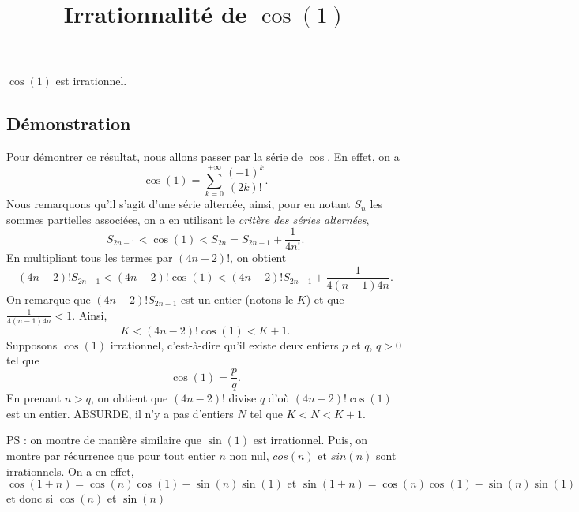 \documentclass[fontsize=12pt,twoside=false,parskip=half,french]{scrartcl}
\title{Irrationnalité de $\cos(1)$}
\date{}
\author{}
\begin{document}
\maketitle
   \begin{Theoreme}
      $\cos(1)$ est irrationnel.
   \end{Theoreme}
   \subsection{Démonstration}
      Pour démontrer ce résultat, nous allons passer par la série de $\cos$.
      En effet, on a 
      \[
        \cos(1) = \sum_{k = 0}^{+\infty} \frac{(-1)^k}{(2k)!}.
      \]
      Nous remarquons qu'il s'agit d'une série alternée, ainsi, pour en notant
      $S_n$ les sommes partielles associées, on a en utilisant le \emph{critère des séries alternées},
      \[
         S_{2n - 1} < \cos(1) < S_{2n} = S_{2n - 1} + \frac{1}{4n!}.
      \]
      En multipliant tous les termes par $(4n - 2)!$, on obtient
      \[
         (4n - 2)!S_{2n - 1} < (4n - 2)!\cos(1) < (4n - 2)!S_{2n - 1} + \frac{1}{4(n - 1)4n}.
      \]
      On remarque que $(4n - 2)!S_{2n - 1}$ est un entier (notons le $K$) et 
      que $\frac{1}{4(n - 1)4n} < 1$. Ainsi,
      \[
        K < (4n - 2)!\cos(1) < K + 1.
      \]
      Supposons $\cos(1)$ irrationnel, c'est-à-dire qu'il existe deux entiers $p$
      et $q$, $q > 0$ tel que
      \[
         \cos(1) = \frac{p}{q}.
      \] 
      En prenant $n > q$, on obtient que $(4n - 2)!$ divise $q$ d'où $(4n - 2)!\cos(1)$ 
      est un entier. ABSURDE, il n'y a pas d'entiers $N$ tel que $K < N < K + 1$.
      
      PS : on montre de manière similaire que $\sin(1)$ est irrationnel. Puis,
      on montre par récurrence que pour tout entier $n$ non nul, 
      $cos(n)$ et $sin(n)$ sont irrationnels. On a en effet,
      \[
        \cos(1 + n) = \cos(n)\cos(1) - \sin(n)\sin(1) \text{ et }
        \sin(1 + n) = \cos(n)\cos(1) - \sin(n)\sin(1)
      \]
      et donc si $\cos(n)$ et $\sin(n)$
\end{document}

